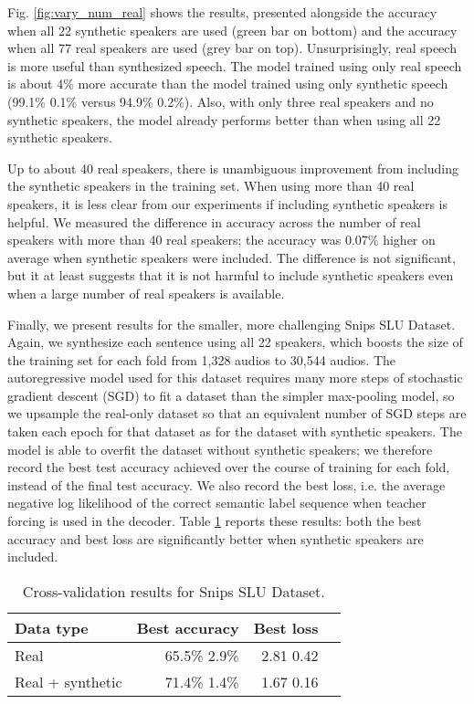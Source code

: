 \documentclass{article}
\begin{document}
Fig. \ref{fig:vary_num_real} shows the results, presented alongside the accuracy when all 22 synthetic speakers are used (green bar on bottom) and the accuracy when all 77 real speakers are used (grey bar on top). Unsurprisingly, real speech is more useful than synthesized speech. The model trained using only real speech is about 4\% more accurate than the model trained using only synthetic speech (99.1\%  0.1\% versus 94.9\%  0.2\%). Also, with only three real speakers and no synthetic speakers, the model already performs better than when using all 22 synthetic speakers. 

Up to about 40 real speakers, there is unambiguous improvement from including the synthetic speakers in the training set. When using more than 40 real speakers, it is less clear from our experiments if including synthetic speakers is helpful. We measured the difference in accuracy across the number of real speakers with more than 40 real speakers; the accuracy was 0.07\% higher on average when synthetic speakers were included. The difference is not significant, but it at least suggests that it is not harmful to include synthetic speakers even when a large number of real speakers is available.

Finally, we present results for the smaller, more challenging Snips SLU Dataset. Again, we synthesize each sentence using all 22 speakers, which boosts the size of the training set for each fold from 1,328 audios to 30,544 audios. The autoregressive model used for this dataset requires many more steps of stochastic gradient descent (SGD) to fit a dataset than the simpler max-pooling model, so we upsample the real-only dataset so that an equivalent number of SGD steps are taken each epoch for that dataset as for the dataset with synthetic speakers. The model is able to overfit the dataset without synthetic speakers; we therefore record the best test accuracy achieved over the course of training for each fold, instead of the final test accuracy. We also record the best loss, i.e. the average negative log likelihood of the correct semantic label sequence when teacher forcing is used in the decoder. Table \ref{tab:snips} reports these results: both the best accuracy and best loss are significantly better when synthetic speakers are included.

\begin{table}
  \caption{Cross-validation results for Snips SLU Dataset.}
  \label{tab:snips}
  \centering
  \begin{tabular}{l r r r}
    \toprule
    \textbf{Data type} & \textbf{Best accuracy} & \textbf{Best loss}\\
    \midrule
    Real & 65.5\%  2.9\% & 2.81  0.42\\
    Real + synthetic  & 71.4\%  1.4\% & 1.67  0.16\\
\bottomrule
  \end{tabular}
  
\end{table}
\end{document}
